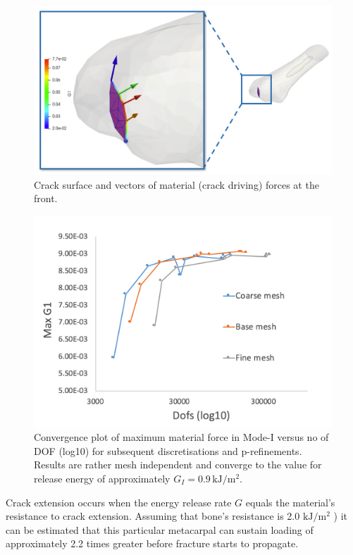 \documentclass[11pt]{acmeArticle}
\numberwithin{equation}{section}
\begin{document}
\begin{figure}
	\centering
	\includegraphics[width=0.9\linewidth]{Figures/crack_front_force.png}
	\caption{Crack surface and vectors of material (crack driving) forces at the front.}
	\label{fig:crackfrontforce}
\end{figure}

\begin{figure}
	\centering
	\includegraphics[width=0.7\linewidth]{Figures/graphs/max_g1_convergece.png}
	\caption{Convergence plot of maximum material force in Mode-I versus no of DOF (log10) for subsequent discretisations and p-refinements. Results are rather mesh independent and converge to the value for release energy of approximately $ G_I = 0.9 \, \mathrm{kJ} / \mathrm{m}^2$. }
	\label{fig:max_g1_convergece}
\end{figure}
Crack extension occurs when the energy release rate $G$ equals the material's resistance to crack extension. Assuming that bone's resistance is 2.0 $\mathrm{ kJ/m^2}$ ) \citep{gasser2007numerical} it can be estimated that this particular metacarpal can sustain loading of approximately 2.2 times greater before fracture starts to propagate. 
\end{document}
